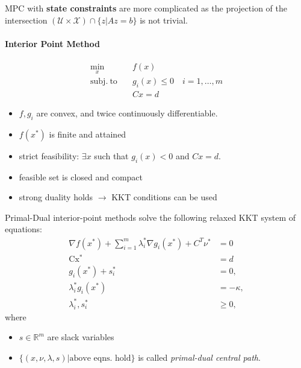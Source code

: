 \newpar{}
MPC with \textbf{state constraints} are more complicated as the projection of the intersection $(\mathcal{U}\times \mathcal{X}) \cap \{ z|Az=b\}$ is not trivial.

\paragraph{Interior Point Method}
\begin{align*}
    \min_x \quad            & f(x)                             \\
    \mathrm{subj.\ to}\quad & g_i(x)\leq 0 \quad i=1,\ldots, m \\
                            & Cx = d
\end{align*}
\begin{itemize}
    \item $f, g_i$ are convex, and twice continuously differentiable.
    \item $f(x^*)$ is finite and attained
    \item strict feasibility: $\exists x$ such that $g_i(x) < 0$ and $Cx = d$.
    \item feasible set is closed and compact
    \item strong duality holds $\to$ KKT conditions can be used
\end{itemize}

\newpar{}

Primal-Dual interior-point methods solve the following relaxed KKT system of equations:
\begin{align*}
    \nabla f(x^{*})+\sum_{i=1}^{m}\lambda_{i}^{*}\nabla g_{i}(x^{*})+C^{T}\nu^{*} & =0        \\
    \mathrm{Cx^*}                                                                 & =d        \\
    g_i(x^*)+s_i^*                                                                & =0,       \\
    \lambda_{i}^{*}g_{i}(x^{*})                                                   & =-\kappa, \\
    \lambda_{i}^{*},s_{i}^{*}                                                     & \geq0,
\end{align*}
where
\begin{itemize}
    \item $s\in \mathbb{R}^m$ are slack variables
    \item $\{(x,\nu,\lambda,s)|\text{above eqns.\ hold}\}$ is called \textit{primal-dual central path}.
\end{itemize}

